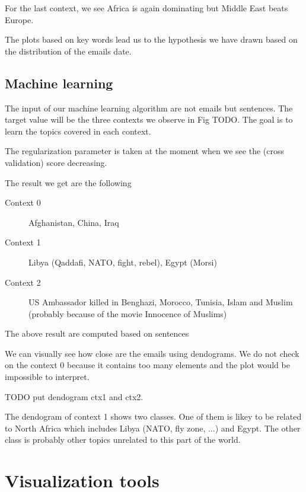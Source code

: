 \documentclass[11pt]{article}
\begin{document}
For the last context, we see Africa is again dominating but Middle East beats Europe.

The plots based on key words lead us to the hypothesis we have drawn based on the distribution of the emails date.

\subsection{Machine learning}

The input of our machine learning algorithm are not emails but sentences. The target value will be the three contexts we observe in Fig TODO. The goal is to learn the topics covered in each context.

The regularization parameter is taken at the moment when we see the (cross validation) score decreasing.

The result we get are the following

\begin{description}
    \item[Context 0] Afghanistan, China, Iraq
    \item[Context 1] Libya (Qaddafi, NATO, fight, rebel), Egypt (Morsi)
    \item[Context 2] US Ambassador killed in Benghazi, Morocco, Tunisia, Islam and Muslim (probably because of the movie Innocence of Muslims)
\end{description}

The above result are computed based on sentences

We can visually see how close are the emails using dendograms. We do not check on the context 0 because it contains too many elements and the plot would be impossible to interpret.

TODO put dendogram ctx1 and ctx2.

The dendogram of context 1 shows two classes. One of them is likey to be related to North Africa which includes Libya (NATO, fly zone, ...) and Egypt. The other class is probably other topics unrelated to this part of the world.

\section{Visualization tools}
\end{document}
